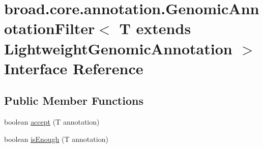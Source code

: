 \hypertarget{interfacebroad_1_1core_1_1annotation_1_1_genomic_annotation_filter_3_01_t_01extends_01_lightweight_genomic_annotation_01_4}{\section{broad.\+core.\+annotation.\+Genomic\+Annotation\+Filter$<$ T extends Lightweight\+Genomic\+Annotation $>$ Interface Reference}
\label{interfacebroad_1_1core_1_1annotation_1_1_genomic_annotation_filter_3_01_t_01extends_01_lightweight_genomic_annotation_01_4}
}
\subsection*{Public Member Functions}
\begin{DoxyCompactItemize}
\item 
boolean \hyperlink{interfacebroad_1_1core_1_1annotation_1_1_genomic_annotation_filter_3_01_t_01extends_01_lightweight_genomic_annotation_01_4_afc458fb425244bf2900ad15e4318c269}{accept} (T annotation)
\item 
boolean \hyperlink{interfacebroad_1_1core_1_1annotation_1_1_genomic_annotation_filter_3_01_t_01extends_01_lightweight_genomic_annotation_01_4_a98ff6734ee1846a62d2510612d707fe9}{is\+Enough} (T annotation)
\end{DoxyCompactItemize}


